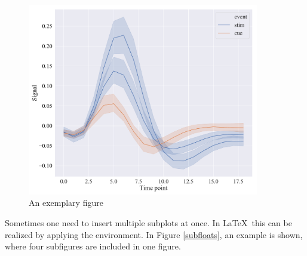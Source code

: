 	\begin{figure}[h!]
		\centering
		\includegraphics[width=0.9\textwidth]{fig_1.pdf} 
		\caption{An exemplary figure} 
		\label{fig_1} 
	\end{figure} 

	Sometimes one need to insert multiple subplots at once. In \LaTeX~this can be realized by applying the {\color{blue}{\verb|\subfloat|}} environment. In Figure \ref{subfloats}, an example is shown, where four subfigures are included in one figure.
	
